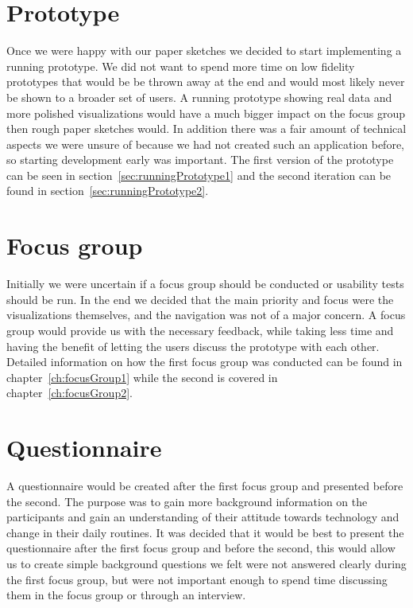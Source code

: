 \section{Prototype}
Once we were happy with our paper sketches we decided to start implementing a running prototype. We did not want to spend more time on low fidelity prototypes that would be be thrown away at the end and would most likely never be shown to a broader set of users. A running prototype showing real data and more polished visualizations would have a much bigger impact on the focus group then rough paper sketches would. In addition there was a fair amount of technical aspects we were unsure of because we had not created such an application before, so starting development early was important. The first version of the prototype can be seen in section~\ref{sec:runningPrototype1} and the second iteration can be found in section~\ref{sec:runningPrototype2}.

\section{Focus group}
Initially we were uncertain if a focus group should be conducted or usability tests should be run. In the end we decided that the main priority and focus were the visualizations themselves, and the navigation was not of a major concern. A focus group would provide us with the necessary feedback, while taking less time and having the benefit of letting the users discuss the prototype with each other. Detailed information on how the first focus group was conducted can be found in chapter~\ref{ch:focusGroup1} while the second is covered in chapter~\ref{ch:focusGroup2}.

\section{Questionnaire}
A questionnaire would be created after the first focus group and presented before the second. The purpose was to gain more background information on the participants and gain an understanding of their attitude towards technology and change in their daily routines.
It was decided that it would be best to present the questionnaire after the first focus group and before the second, this would allow us to create simple background questions we felt were not answered clearly during the first focus group, but were not important enough to spend time discussing them in the focus group or through an interview.

